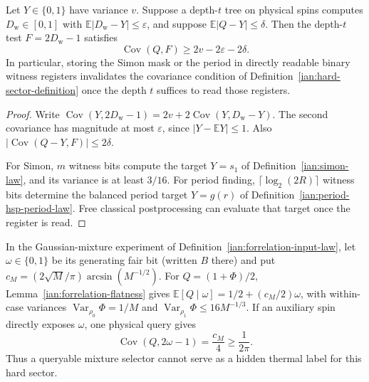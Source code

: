 \begin{lemma}
\label{ian:thermal-exposed-witness}
Let \(Y\in\{0,1\}\) have variance \(v\). Suppose a depth-\(t\) tree on
physical spins computes \(D_{\mathrm w}\in[0,1]\) with
\(\mathbb E|D_{\mathrm w}-Y|\le\varepsilon\), and suppose
\(\mathbb E|Q-Y|\le\delta\). Then the depth-\(t\) test
\(F=2D_{\mathrm w}-1\) satisfies
\[
 \operatorname{Cov}(Q,F)
 \ge2v-2\varepsilon-2\delta.
 \tag{36.26}
\]
In particular, storing the Simon mask or the period in directly
readable binary witness registers invalidates the covariance condition
of Definition~\ref{ian:hard-sector-definition} once the depth \(t\)
suffices to read those registers.
\end{lemma}

\begin{proof}
Write
\(\operatorname{Cov}(Y,2D_{\mathrm w}-1)
=2v+2\operatorname{Cov}(Y,D_{\mathrm w}-Y)\).
The second covariance has magnitude at most \(\varepsilon\), since
\(|Y-\mathbb EY|\le1\).
Also
\(|\operatorname{Cov}(Q-Y,F)|\le2\delta\).

For Simon, \(m\) witness bits compute the target \(Y=s_1\) of
Definition~\ref{ian:simon-law}, and its variance is
at least \(3/16\). For period finding,
\(\lceil\log_2(2R)\rceil\) witness bits determine the balanced period
target \(Y=g(r)\) of Definition~\ref{ian:period-hsp-period-law}. Free
classical postprocessing can evaluate that target once the register
is read.
\end{proof}

\begin{remark}
\label{ian:thermal-forrelation-selector-leakage}
In the Gaussian-mixture experiment of
Definition~\ref{ian:forrelation-input-law}, let \(\omega\in\{0,1\}\)
be its generating fair bit (written \(B\) there) and put
\(c_M=(2\sqrt M/\pi)\arcsin(M^{-1/2})\).
For \(Q=(1+\Phi)/2\), Lemma~\ref{ian:forrelation-flatness} gives
\(\mathbb E[Q\mid\omega]=1/2+(c_M/2)\omega\), with within-case
variances \(\operatorname{Var}_{\rho_0}\Phi=1/M\) and
\(\operatorname{Var}_{\rho_1}\Phi\le16M^{-1/3}\).
If an auxiliary spin directly exposes \(\omega\), one physical query gives
\[
 \operatorname{Cov}(Q,2\omega-1)=\frac{c_M}{4}
 \ge\frac1{2\pi}.
 \tag{36.27}
\]
Thus a queryable mixture selector cannot serve as a hidden thermal
label for this hard sector.
\end{remark}

